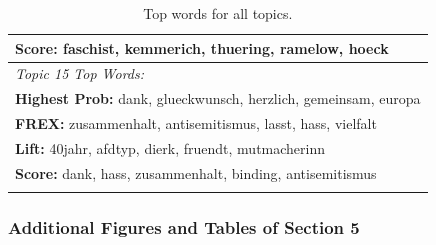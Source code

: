 \begin{center}
\begin{longtable}{|l|}
 	 \textbf{Score:} faschist, kemmerich, thuering, ramelow, hoeck \\
\hline
\textit{Topic 15 Top Words:}\\
 	 \textbf{Highest Prob:} dank, glueckwunsch, herzlich, gemeinsam, europa \\
 	 \textbf{FREX:} zusammenhalt, antisemitismus, lasst, hass, vielfalt \\
 	 \textbf{Lift:} 40jahr, afdtyp, dierk, fruendt, mutmacherinn \\
 	 \textbf{Score:} dank, hass, zusammenhalt, binding, antisemitismus \\
\hline
\caption{Top words for all topics.}
\label{tab:top_words_complete} 
\end{longtable}
\end{center}

\subsubsection*{Additional Figures and Tables of Section 5}

